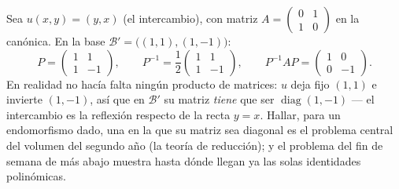 \begin{example}
\label{ex:b1:matrices:conjugationrun}
Sea $u(x, y) = (y, x)$ (el intercambio), con matriz
$A = \begin{pmatrix} 0 & 1\\ 1 & 0\end{pmatrix}$ en la 
canónica. En la base $\mathcal B' = \bigl((1,1), (1,-1)\bigr)$:
\[
P = \begin{pmatrix} 1 & 1\\ 1 & -1 \end{pmatrix},
\qquad
P^{-1} = \frac12\begin{pmatrix} 1 & 1\\ 1 & -1 \end{pmatrix},
\qquad
P^{-1} A P = \begin{pmatrix} 1 & 0\\ 0 & -1 \end{pmatrix}.
\]
En realidad no hacía falta ningún producto de matrices: $u$ deja fijo
$(1,1)$ e invierte $(1,-1)$, así que en $\mathcal B'$ su matriz
\emph{tiene} que ser $\operatorname{diag}(1, -1)$ --- el intercambio
es la reflexión respecto de la recta $y = x$. Hallar, para un
endomorfismo dado, una  en la que su matriz sea diagonal es el
problema central del volumen del segundo año (la teoría de
reducción); y el problema del fin de semana de más abajo muestra
hasta dónde llegan ya las solas identidades polinómicas.
\end{example}

